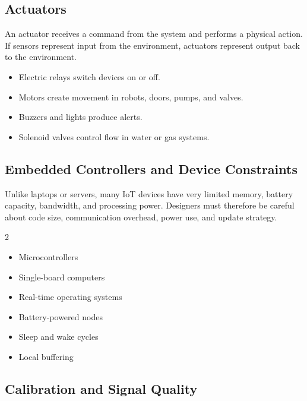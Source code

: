 \documentclass[11pt,a4paper]{article}
\begin{document}
\subsection{Actuators}

\begin{definitionbox}[Actuator]
An actuator receives a command from the system and performs a physical action. If sensors represent input from the environment, actuators represent output back to the environment.
\end{definitionbox}

\begin{itemize}[leftmargin=*]
  \item Electric relays switch devices on or off.
  \item Motors create movement in robots, doors, pumps, and valves.
  \item Buzzers and lights produce alerts.
  \item Solenoid valves control flow in water or gas systems.
\end{itemize}

\subsection{Embedded Controllers and Device Constraints}

\begin{conceptbox}
Unlike laptops or servers, many IoT devices have very limited memory, battery capacity, bandwidth, and processing power. Designers must therefore be careful about code size, communication overhead, power use, and update strategy.
\end{conceptbox}

\begin{multicols}{2}
\begin{itemize}[leftmargin=1.2em]
  \item Microcontrollers
  \item Single-board computers
  \item Real-time operating systems
  \item Battery-powered nodes
  \item Sleep and wake cycles
  \item Local buffering
\end{itemize}
\end{multicols}

\subsection{Calibration and Signal Quality}
\end{document}
